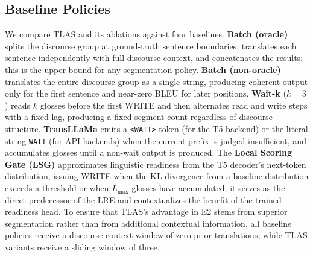 \documentclass[conference]{IEEEtran}
\begin{document}
\subsection{Baseline Policies}

We compare TLAS and its ablations against four baselines. \textbf{Batch (oracle)} splits the discourse group at ground-truth sentence boundaries, translates each sentence independently with full discourse context, and concatenates the results; this is the upper bound for any segmentation policy. \textbf{Batch (non-oracle)} translates the entire discourse group as a single string, producing coherent output only for the first sentence and near-zero BLEU for later positions. \textbf{Wait-k} ($k = 3$) \cite{ma2019stacl} reads $k$ glosses before the first WRITE and then alternates read and write steps with a fixed lag, producing a fixed segment count regardless of discourse structure. \textbf{TransLLaMa} \cite{koshkin2024transllama} emits a \texttt{<WAIT>} token (for the T5 backend) or the literal string \texttt{WAIT} (for API backends) when the current prefix is judged insufficient, and accumulates glosses until a non-wait output is produced. The \textbf{Local Scoring Gate (LSG)} approximates linguistic readiness from the T5 decoder's next-token distribution, issuing WRITE when the KL divergence from a baseline distribution exceeds a threshold or when $L_{\max}$ glosses have accumulated; it serves as the direct predecessor of the LRE and contextualizes the benefit of the trained readiness head. To ensure that TLAS's advantage in E2 stems from superior segmentation rather than from additional contextual information, all baseline policies receive a discourse context window of zero prior translations, while TLAS variants receive a sliding window of three.
\end{document}
